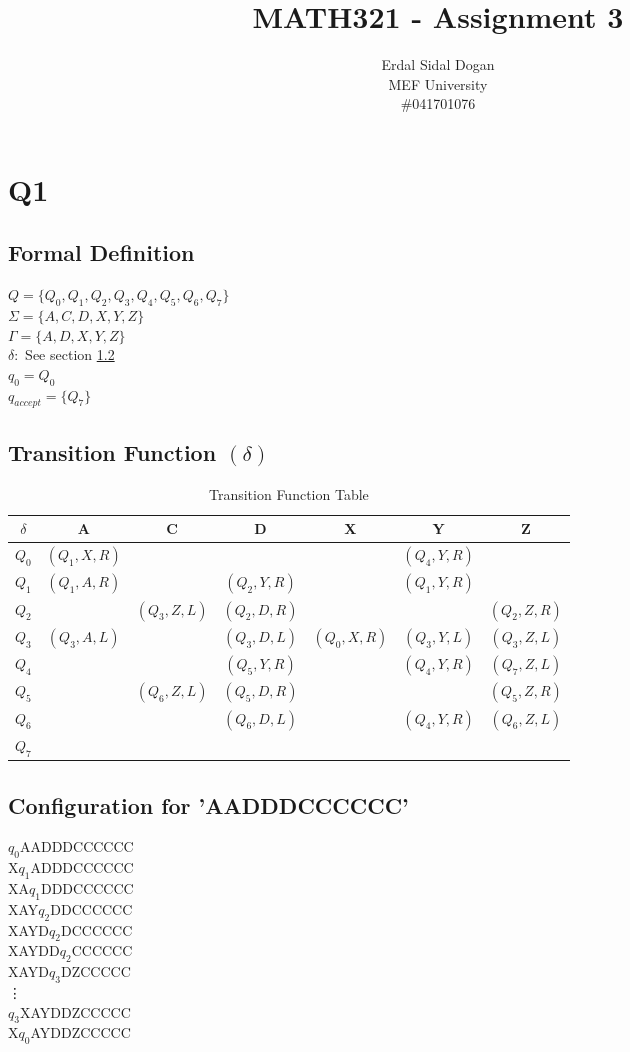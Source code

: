 \documentclass{article}
\title{MATH321 - Assignment 3}
\author{Erdal Sidal Dogan\\ MEF University\\ \#041701076}
\begin{document}
	\maketitle
	\section{Q1}
	\subsection{Formal Definition}
	$Q = \{Q_0, Q_1, Q_2, Q_3, Q_4, Q_5, Q_6, Q_7\}$\\
	$\Sigma = \{A, C, D, X, Y, Z\}$\\
	$\Gamma =  \{A, D, X, Y, Z\}$\\
	$\delta: $ See section \ref{tf}\\
	$q_0 = Q_0$\\
	$q_{accept} = \{ Q_7\}$\\
	
	\subsection{Transition Function $(\delta)$} \label{tf}
	\begin{table}[h]
		\centering
			\begin{tabular}{c|c|c|c|c|c|c}
				$\delta$ & A & C & D & X & Y & Z \\
				\hline
				$Q_0$ & $(Q_1, X, R)$ & & & & $(Q_4, Y, R)$ & \\
				$Q_1$ & $(Q_1, A, R)$  & & $(Q_2, Y, R)$ & & $(Q_1, Y, R)$ & \\
				$Q_2$ & & $(Q_3, Z, L)$ & $(Q_2, D, R)$ & & & $(Q_2, Z, R)$ \\
				$Q_3$ & $(Q_3, A, L)$ & & $(Q_3, D, L)$ & $(Q_0, X, R)$ & $(Q_3, Y, L)$ & $(Q_3, Z, L)$ \\
				$Q_4$ & & & $(Q_5, Y, R)$ & & $(Q_4, Y, R)$&$(Q_7, Z, L)$ \\
				$Q_5$ & & $(Q_6, Z, L)$ & $(Q_5, D, R)$ & & &$(Q_5, Z, R)$ \\
				$Q_6$ & & & $(Q_6, D, L)$ & & $(Q_4, Y, R)$ & $(Q_6, Z, L)$ \\
				$Q_7$ & & & & & & \\
	
		\end{tabular}
		\caption{Transition Function Table}
	\end{table}
	
	\subsection{Configuration for 'AADDDCCCCCC'}
	$q_0$AADDDCCCCCC\\
	X$q_1$ADDDCCCCCC\\
	XA$q_1$DDDCCCCCC\\
	XAY$q_2$DDCCCCCC\\
	XAYD$q_2$DCCCCCC\\
	XAYDD$q_2$CCCCCC\\
	XAYD$q_3$DZCCCCC\\
	\vdots \\
	$q_3$XAYDDZCCCCC\\
	X$q_0$AYDDZCCCCC\\
\end{document}

